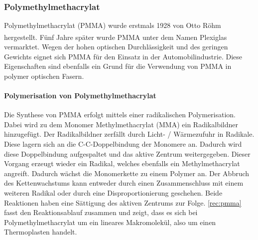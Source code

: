 \subsubsection{Polymethylmethacrylat}
\label{subsec:pofpmma}

Polymethylmethacrylat (PMMA) wurde erstmals 1928 von Otto Röhm hergestellt. Fünf
Jahre später wurde PMMA unter dem Namen
Plexiglas\textsuperscript{\textregistered} vermarktet. Wegen der hohen optischen
Durchlässigkeit und des geringen Gewichts eignet sich PMMA für den Einsatz in
der Automobilindustrie. Diese Eigenschaften sind ebenfalls ein Grund für die
Verwendung von PMMA in polymer optischen Fasern. \cite{pofwuppmma}

\paragraph{Polymerisation von Polymethylmethacrylat} Die Synthese von PMMA
erfolgt mittels einer radikalischen Polymerisation. Dabei wird zu dem Monomer
Methylmethacrylat (MMA) ein Radikalbildner hinzugefügt. Der Radikalbildner
zerfällt durch Licht- / Wärmezufuhr in Radikale. Diese lagern sich an die
C-C-Doppelbindung der Monomere an. Dadurch wird diese Doppelbindung
aufgespaltet und das aktive Zentrum weitergegeben. Dieser Vorgang erzeugt wieder
ein Radikal, welches ebenfalls ein Methylmethacrylat angreift. Dadurch wächst
die Monomerkette zu einem Polymer an. Der Abbruch des Kettenwachstums kann
entweder durch einen Zusammenschluss mit einem weiteren Radikal oder durch eine
Disproportionierung geschehen. Beide Reaktionen haben eine Sättigung des aktiven
Zentrums zur Folge. \autoref{rec:pmma} fasst den Reaktionsablauf zusammen und
zeigt, dass es sich bei Polymethylmethacrylat um ein lineares Makromolekül, also
um einen Thermoplasten handelt.


